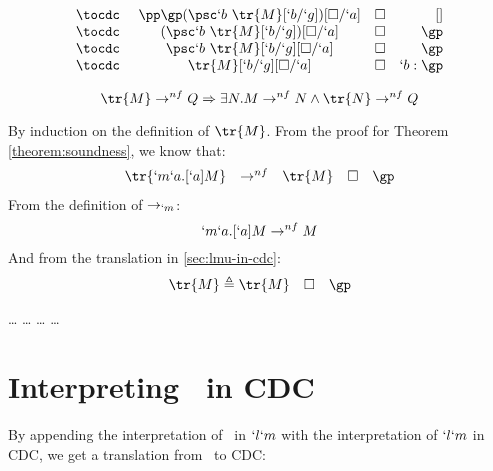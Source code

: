 \begin{Proof}
\[\begin{array}{lcrr}
  \tocdc\     & \pp \gp (\psc `b\ \tr{M}[`b/`g])[\square/`a]     & \square & []        \\
  \tocdc\     & (\psc `b\ \tr{M}[`b/`g])[\square/`a]             & \square & \gp       \\
  \tocdc\     & \psc `b\ \tr{M}[`b/`g][\square/`a]               & \square & \gp       \\
  \tocdc\     & \tr{M}[`b/`g][\square/`a]                        & \square & `b:\gp \\
\end{array}
\]
\end{Proof}

\begin{theorem}[Completeness of $\tr{`.}$]
\[
  \tr{M} \to^{nf} Q \Rightarrow \exists N. M \to^{nf} N \land \tr{N} \to^{nf} Q
\]
\end{theorem}
\begin{Proof}
By induction on the definition of $\tr{M}$.
From the proof for Theorem \ref{theorem:soundness}, we know that:
\[
\begin{array}{rclll}
\tr{`m`a.[`a]M} & \to^{nf} & \tr{M} & \square & \gp
\end{array}
\]
From the definition of $\to_{`m}$:
\[
`m`a.[`a]M \to^{nf} M
\]
And from the translation in \ref{sec:lmu-in-cdc}:
\[
\begin{array}{rclll}
\tr{M} \triangleq \tr{M} & \square & \gp 
\end{array}
\]

\dots
{}
\dots
{}
\dots
{}
\dots
\end{Proof}


\section{Interpreting \ltry\ in CDC}

  By appending the interpretation of \ltry\ in $`l`m$ with the interpretation of
  $`l`m$ in CDC, we get a translation from \ltry\ to CDC:


